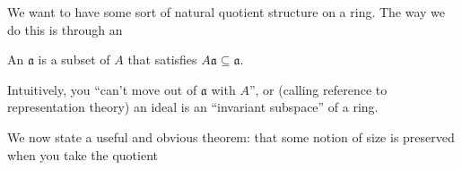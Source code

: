\documentclass[11pt]{article}
\begin{document}
We want to have some sort of natural quotient structure
on a ring. The way we do this is through an 
\begin{definition}
    An  $\mathfrak{a}$ is a subset of $A$
    that satisfies $A\mathfrak{a} \subseteq \mathfrak{a}$.
\end{definition}
Intuitively, you ``can't move out of $\mathfrak{a}$ with $A$'',
or (calling reference to representation theory) an
ideal is an ``invariant subspace'' of a ring.

We now state a useful and obvious theorem: that
some notion of size is preserved when you take the quotient
\end{document}
